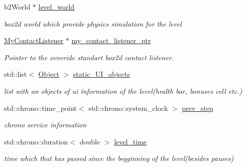 \begin{DoxyCompactItemize}
b2\+World $\ast$ \hyperlink{class_level_ab71a19e06640f896110d22af9142b856}{level\+\_\+world}
\begin{DoxyCompactList}\small\item\em box2d world which provide physics simulation for the level \end{DoxyCompactList}\item 
\mbox{\label{class_level_a04e0e1e3a076f70e85a37caf33689416}} 
\hyperlink{class_my_contact_listener}{My\+Contact\+Listener} $\ast$ \hyperlink{class_level_a04e0e1e3a076f70e85a37caf33689416}{my\+\_\+contact\+\_\+listener\+\_\+ptr}
\begin{DoxyCompactList}\small\item\em Pointer to the ovveride standart box2d contact listener. \end{DoxyCompactList}\item 
\mbox{\label{class_level_a89802def1a1b4e8768806a41d972c32c}} 
std\+::list$<$ \hyperlink{class_object}{Object} $>$ \hyperlink{class_level_a89802def1a1b4e8768806a41d972c32c}{static\+\_\+\+U\+I\+\_\+objects}
\begin{DoxyCompactList}\small\item\em list with an objects of ui information of the level(health bar, bonuses cell etc.) \end{DoxyCompactList}\item 
\mbox{\label{class_level_a456b63f58afc3c2a0ae917e955ca80df}} 
std\+::chrono\+::time\+\_\+point$<$ std\+::chrono\+::system\+\_\+clock $>$ \hyperlink{class_level_a456b63f58afc3c2a0ae917e955ca80df}{prev\+\_\+step}
\begin{DoxyCompactList}\small\item\em chrono service information \end{DoxyCompactList}\item 
\mbox{\label{class_level_a2c22c40ee8972da9630a327d93db30ed}} 
std\+::chrono\+::duration$<$ double $>$ \hyperlink{class_level_a2c22c40ee8972da9630a327d93db30ed}{level\+\_\+time}
\begin{DoxyCompactList}\small\item\em time which that has passed since the begginning of the level(besides pauses) \end{DoxyCompactList}\end{DoxyCompactItemize}
